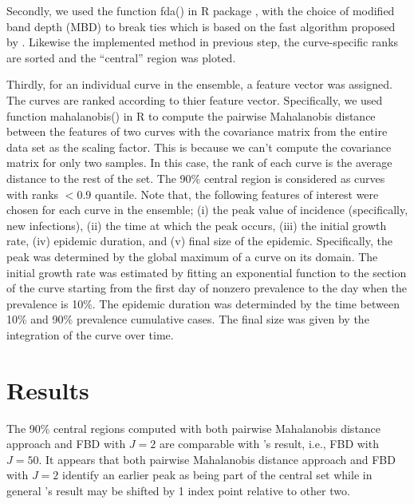\documentclass[fleqn,10pt,lineno]{wlpeerj}
\begin{document}
Secondly, we used the function fda() in R \citep{R} package  \citep{roahd}, with the choice of modified band depth (MBD) to break ties which is based on the fast algorithm proposed by \cite{sun2012exact}. Likewise the implemented method in previous step, the curve-specific ranks are sorted and the ``central'' region was ploted. 

Thirdly, for an individual curve in the ensemble, a feature vector was assigned. The curves are ranked according to thier feature vector. Specifically, we used function mahalanobis() in R \citep{R} to compute the pairwise Mahalanobis distance between the features of two curves with the covariance matrix from the entire data set as the scaling factor. This is because we can't compute the covariance matrix for only two samples. In this case, the rank of each curve is the average distance to the rest of the set. The 90\% central region is considered as curves with ranks $< 0.9$ quantile. Note that, the following features of interest were chosen for each curve in the ensemble; (i) the peak value of incidence (specifically, new infections), (ii) the time at which the peak occurs, (iii) the initial growth rate, (iv) epidemic duration, and (v) final size of the epidemic. Specifically, the peak was determined by the global maximum of a curve on its domain. The initial growth rate was estimated by fitting an exponential function to the section of the curve starting from the first day of nonzero prevalence to the day when the prevalence is 10\%. The epidemic duration was determinded by the time between 10\% and 90\% prevalence cumulative cases. The final size was given by the integration of the curve over time.


\section*{Results}

The 90\% central regions computed with both pairwise Mahalanobis distance approach and FBD with $J=2$ are comparable with \juul's result, i.e., FBD with $J=50$. It appears that both pairwise Mahalanobis distance approach and FBD with $J=2$ identify an earlier peak as being part of the central set while in general \juul's result may be shifted by 1 index point relative to other two.
\end{document}
